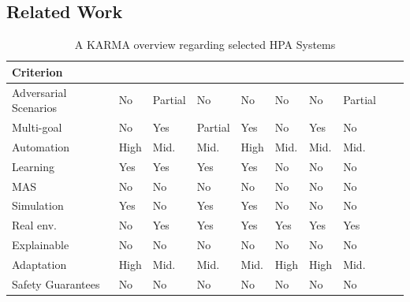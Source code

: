 
\subsection{Related Work}
\label{sec:related_work}

\begin{table}[h!]
    \centering
    \caption{A KARMA overview regarding selected HPA Systems}
    \label{tab:autoscaling_criteria}
    {\footnotesize
    \renewcommand{\arraystretch}{1.1}
    \begin{tabular}{>{\raggedright\arraybackslash}m{1.3cm}>{\centering\arraybackslash}m{0.6cm}>{\centering\arraybackslash}m{0.6cm}>{\centering\arraybackslash}m{0.6cm}>{\centering\arraybackslash}m{0.6cm}>{\centering\arraybackslash}m{0.6cm}>{\centering\arraybackslash}m{0.6cm}>{\centering\arraybackslash}m{0.6cm}>{\centering\arraybackslash}m{0.6cm}>{\centering\arraybackslash}m{0.6cm}}
    \hline
    \textbf{Criterion} & \vspace{-0.3cm}\textbf{\cite{gymhpa2022}} & \vspace{-0.3cm}\textbf{\cite{aware2023}} & \vspace{-0.3cm}\textbf{\cite{Rossi2019}} & \vspace{-0.3cm}\textbf{\cite{QoSRL}} & \vspace{-0.3cm}\textbf{\cite{Zhou2024}} & \vspace{-0.3cm}\textbf{\cite{KOSMOS}} & \vspace{-0.3cm}\textbf{\cite{COPA}} \\
    \hline
    \hline
    Adversarial Scenarios & No & Partial & No & No & No & No & Partial \\
    \hline
    Multi-goal & No & Yes & Partial & Yes & No & Yes & No \\
    \hline
    Automation & High & Mid. & Mid. & High & Mid. & Mid. & Mid. \\
    \hline
    Learning & Yes & Yes & Yes & Yes & No & No & No \\
    \hline
    MAS & No & No & No & No & No & No & No \\
    \hline
    Simulation & Yes & No & Yes & Yes & No & No & No \\
    \hline
    Real env. & No & Yes & Yes & Yes & Yes & Yes & Yes \\
    \hline
    Explainable & No & No & No & No & No & No & No \\
    \hline
    Adaptation & High & Mid. & Mid. & Mid. & High & High & Mid. \\
    \hline
    Safety Guarantees & No & No & No & No & No & No & No \\
    \hline
    \end{tabular}%
    }
  \end{table}


